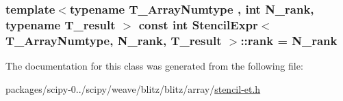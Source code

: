 \subsubsection[{rank}]{\setlength{\rightskip}{0pt plus 5cm}template$<$typename T\+\_\+\+Array\+Numtype , int N\+\_\+rank, typename T\+\_\+result $>$ const int {\bf Stencil\+Expr}$<$ T\+\_\+\+Array\+Numtype, N\+\_\+rank, T\+\_\+result $>$\+::rank = N\+\_\+rank\hspace{0.3cm}{\ttfamily [static]}}\label{classStencilExpr_ad3f5edc99b864f011b2d88bce7ac3b48}


The documentation for this class was generated from the following file\+:\begin{DoxyCompactItemize}
\item 
packages/scipy-\/0../scipy/weave/blitz/blitz/array/\hyperlink{stencil-et_8h}{stencil-\/et.\+h}\end{DoxyCompactItemize}

